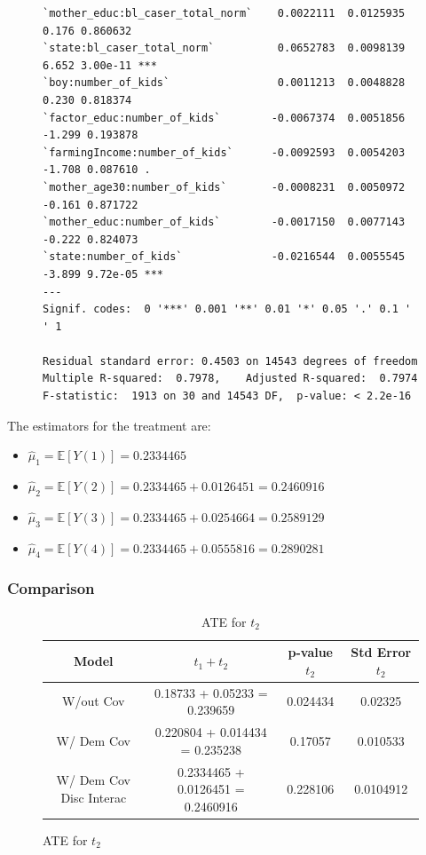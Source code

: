 \documentclass{article}
\begin{document}
\begin{figure}[H]
\begin{lstlisting}[style=RstyleComment, caption=Regression with Demeaned Covariates and Interaction with Discrete Variables]
`mother_educ:bl_caser_total_norm`    0.0022111  0.0125935   0.176 0.860632    
`state:bl_caser_total_norm`          0.0652783  0.0098139   6.652 3.00e-11 ***
`boy:number_of_kids`                 0.0011213  0.0048828   0.230 0.818374    
`factor_educ:number_of_kids`        -0.0067374  0.0051856  -1.299 0.193878    
`farmingIncome:number_of_kids`      -0.0092593  0.0054203  -1.708 0.087610 .  
`mother_age30:number_of_kids`       -0.0008231  0.0050972  -0.161 0.871722    
`mother_educ:number_of_kids`        -0.0017150  0.0077143  -0.222 0.824073    
`state:number_of_kids`              -0.0216544  0.0055545  -3.899 9.72e-05 ***
---
Signif. codes:  0 '***' 0.001 '**' 0.01 '*' 0.05 '.' 0.1 ' ' 1

Residual standard error: 0.4503 on 14543 degrees of freedom
Multiple R-squared:  0.7978,	Adjusted R-squared:  0.7974 
F-statistic:  1913 on 30 and 14543 DF,  p-value: < 2.2e-16
\end{lstlisting}
\end{figure}

The estimators for the treatment are:
\begin{itemize}
  \item $\hat{\mu}_1 = \mathbb{E}[Y(1)] = 0.2334465$
  \item $\hat{\mu}_2 = \mathbb{E}[Y(2)] = 0.2334465 + 0.0126451 = 0.2460916$
  \item $\hat{\mu}_3 = \mathbb{E}[Y(3)] = 0.2334465 + 0.0254664 = 0.2589129$
  \item $\hat{\mu}_4 = \mathbb{E}[Y(4)] = 0.2334465 + 0.0555816 = 0.2890281$
\end{itemize}

\subsubsection*{Comparison}

\begin{figure}[H]
  \begin{table}[H]
  \centering
  \label{tab:}
  \begin{tabular}{|cccc|}
    \hline
    Model & $t_1 + t_2$ & p-value $t_2$ & Std Error $t_2$ \\
    \hline
    W/out Cov                & 0.18733 + 0.05233 = 0.239659 & 0.024434         & 0.02325 \\ 
    W/ Dem Cov               & 0.220804 + 0.014434 = 0.235238 & 0.17057        & 0.010533 \\   
    W/ Dem Cov Disc Interac  & 0.2334465 + 0.0126451 = 0.2460916 & 0.228106    & 0.0104912 \\       
    \hline
  \end{tabular}
  \caption{ATE for $t_2$}
\end{table}
\end{figure}
\end{document}
